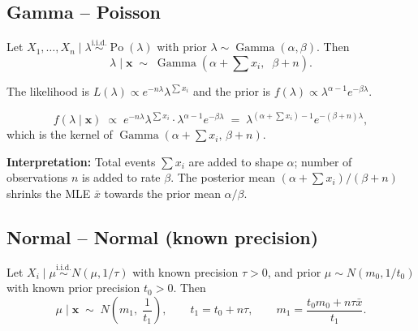 \documentclass[11pt, a4paper]{article}
\newcommand{\iid}{\overset{\text{i.i.d.}}{\sim}}
\begin{document}
\subsection*{Gamma -- Poisson}

\begin{thmbox}
Let $X_1,\ldots,X_n \mid \lambda \iid \operatorname{Po}(\lambda)$ with prior $\lambda \sim \operatorname{Gamma}(\alpha, \beta)$. Then
\[
  \lambda \mid \mathbf{x} \;\sim\; \operatorname{Gamma}\!\left(\alpha + \textstyle\sum x_i,\;\; \beta + n\right).
\]
\end{thmbox}

\begin{exbox}
The likelihood is $L(\lambda) \propto e^{-n\lambda}\lambda^{\sum x_i}$ and the prior is $f(\lambda) \propto \lambda^{\alpha-1}e^{-\beta\lambda}$.

\[
  f(\lambda \mid \mathbf{x}) \;\propto\; e^{-n\lambda}\lambda^{\sum x_i} \cdot \lambda^{\alpha-1}e^{-\beta\lambda}
  \;=\; \lambda^{(\alpha + \sum x_i)-1}e^{-(\beta+n)\lambda},
\]
which is the kernel of $\operatorname{Gamma}(\alpha + \sum x_i,\, \beta + n)$. \medskip

\textbf{Interpretation:} Total events $\sum x_i$ are added to shape $\alpha$; number of observations $n$ is added to rate $\beta$. The posterior mean $(\alpha + \sum x_i)/(\beta + n)$ shrinks the MLE $\bar{x}$ towards the prior mean $\alpha/\beta$.
\end{exbox}

\subsection*{Normal -- Normal (known precision)}

\begin{thmbox}
Let $X_i \mid \mu \iid N(\mu, 1/\tau)$ with known precision $\tau > 0$, and prior $\mu \sim N(m_0, 1/t_0)$ with known prior precision $t_0 > 0$. Then
\[
  \mu \mid \mathbf{x} \;\sim\; N\!\left(m_1,\; \frac{1}{t_1}\right),
  \qquad t_1 = t_0 + n\tau, \qquad m_1 = \frac{t_0 m_0 + n\tau\bar{x}}{t_1}.
\]
\end{thmbox}
\end{document}
